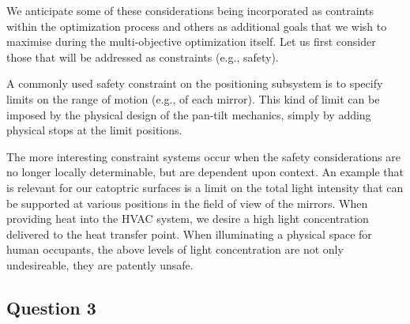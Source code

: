 We anticipate some of these considerations being incorporated as contraints
within the optimization process and others as additional goals that we
wish to maximise during the multi-objective optimization itself.  Let us
first consider those that will be addressed as constraints (e.g., safety).

A commonly used safety constraint on the positioning subsystem is to
specify limits on the range of motion (e.g., of each mirror).  This
kind of limit can be imposed by the physical design of the pan-tilt
mechanics, simply by adding physical stops at the limit positions.

The more interesting constraint systems occur when the safety considerations
are no longer locally determinable, but are dependent upon context.
An example that is relevant for our catoptric surfaces is a limit on
the total light intensity that can be supported at various positions in the
field of view of the mirrors. When providing heat into the HVAC system,
we desire a high light concentration delivered to the heat transfer point.
When illuminating a physical space for human occupants, the above
levels of light concentration are not only undesireable, they are patently
unsafe.


\subsection{Question 3}

